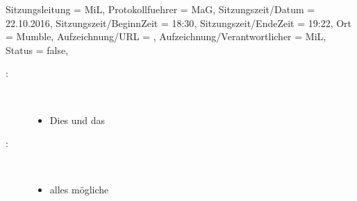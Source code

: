 

\begin{Protokoll}{
        Sitzungsleitung                 = {MiL}, 			%
        Protokollfuehrer                = {MaG},  			%
        Sitzungszeit/Datum              = {22.10.2016},   	%
        Sitzungszeit/BeginnZeit         = {18:30},			%
        Sitzungszeit/EndeZeit           = {19:22},			%
        Ort                             = {Mumble},			%
        Aufzeichnung/URL                = {},				%
        Aufzeichnung/Verantwortlicher   = {MiL},		  	%
        Status                          = {false},			%
    }
    
    \begin{Anwesenheitsliste}
    \end{Anwesenheitsliste}
    
    
    
        \begin{description}
            \item[:] \     
            	\begin{itemize}
				        \item Dies und das
				\end{itemize}
            \item[:]  \     
            	\begin{itemize}
				    \item alles mögliche
				\end{itemize}
		\end{description}
    

\end{Protokoll}
